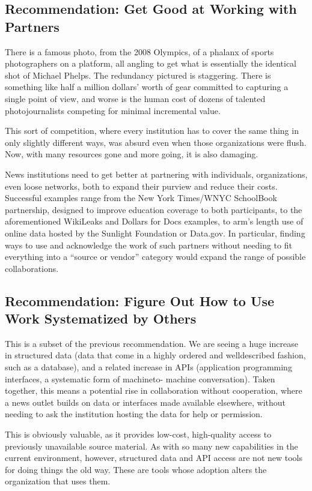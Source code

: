 \subsection{Recommendation: Get Good at Working with Partners}

There is a famous photo, from the 2008 Olympics, of a phalanx of
sports photographers on a platform, all angling to get what is essentially
the identical shot of Michael Phelps. The redundancy pictured is
staggering. There is something like half a million dollars’ worth of gear
committed to capturing a single point of view, and worse is the human
cost of dozens of talented photojournalists competing for minimal
incremental value.

This sort of competition, where every institution has to cover the same
thing in only slightly different ways, was absurd even when those organizations
were flush. Now, with many resources gone and more going,
it is also damaging.

News institutions need to get better at partnering with individuals, organizations,
even loose networks, both to expand their purview and reduce their costs. Successful
examples range from the New York Times/WNYC SchoolBook partnership,
designed to improve education coverage to both participants, to the
aforementioned WikiLeaks and Dollars for Docs examples, to arm’s length use of
online data hosted by the Sunlight Foundation or Data.gov. In particular, finding
ways to use and acknowledge the work of such partners without needing
to fit everything into a ``source or vendor'' category would expand the range of
possible collaborations.

\subsection{Recommendation: Figure Out How to Use Work Systematized by Others}

This is a subset of the previous recommendation. We are seeing a huge
increase in structured data (data that come in a highly ordered and welldescribed
fashion, such as a database), and a related increase in APIs
(application programming interfaces, a systematic form of machineto-
machine conversation). Taken together, this means a potential rise
in collaboration without cooperation, where a news outlet builds on
data or interfaces made available elsewhere, without needing to ask the
institution hosting the data for help or permission.

This is obviously valuable, as it provides low-cost, high-quality access
to previously unavailable source material. As with so many new capabilities
in the current environment, however, structured data and API
access are not new tools for doing things the old way. These are tools
whose adoption alters the organization that uses them.

